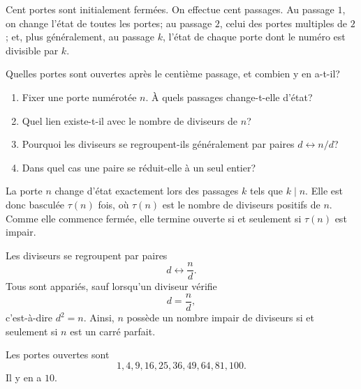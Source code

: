\documentclass[11pt,a4paper]{article}
\begin{document}

\begin{statementbox}
Cent portes sont initialement fermées. On effectue cent passages. Au passage
$1$, on change l'état de toutes les portes; au passage $2$, celui des portes
multiples de $2$; et, plus généralement, au passage $k$, l'état de chaque
porte dont le numéro est divisible par $k$.

Quelles portes sont ouvertes après le centième passage, et combien y en a-t-il?
\end{statementbox}

\begin{hintsbox}
\begin{enumerate}
  \item Fixer une porte numérotée $n$. À quels passages change-t-elle d'état?
  \item Quel lien existe-t-il avec le nombre de diviseurs de $n$?
  \item Pourquoi les diviseurs se regroupent-ils généralement par paires
  $d\leftrightarrow n/d$?
  \item Dans quel cas une paire se réduit-elle à un seul entier?
\end{enumerate}
\end{hintsbox}

\correction

La porte $n$ change d'état exactement lors des passages $k$ tels que $k\mid n$.
Elle est donc basculée $\tau(n)$ fois, où $\tau(n)$ est le nombre de diviseurs
positifs de $n$. Comme elle commence fermée, elle termine ouverte si et
seulement si $\tau(n)$ est impair.

Les diviseurs se regroupent par paires
\[
d\longleftrightarrow\frac nd.
\]
Tous sont appariés, sauf lorsqu'un diviseur vérifie
\[
d=\frac nd,
\]
c'est-à-dire $d^2=n$. Ainsi, $n$ possède un nombre impair de diviseurs si et
seulement si $n$ est un carré parfait.

\begin{resultbox}
Les portes ouvertes sont
\[
\boxed{1,4,9,16,25,36,49,64,81,100}.
\]
Il y en a $\boxed{10}$.
\end{resultbox}
\end{document}
